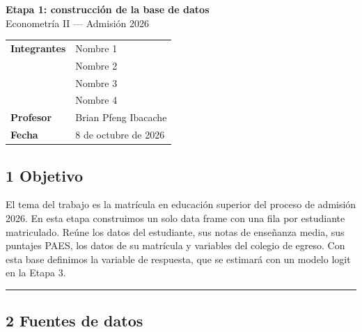 \documentclass[11pt]{article}
\begin{document}
\sloppy

\begin{center}
  {\LARGE \textbf{Etapa 1: construcción de la base de datos}}\\[4pt]
  {\large Econometría II --- Admisión 2026}
\end{center}
\vspace{0.5em}

\begin{center}
\begin{tabular}{ll}
\toprule
\textbf{Integrantes} & Nombre 1 \\
                     & Nombre 2 \\
                     & Nombre 3 \\
                     & Nombre 4 \\
\midrule
\textbf{Profesor}    & Brian Pfeng Ibacache \\
\textbf{Fecha}       & 8 de octubre de 2026 \\
\bottomrule
\end{tabular}
\end{center}

\bigskip

\subsection*{1 \; Objetivo}

El tema del trabajo es la matrícula en educación superior del proceso de
admisión 2026. En esta etapa construimos un solo data frame con una fila
por estudiante matriculado. Reúne los datos del estudiante, sus notas de
enseñanza media, sus puntajes PAES, los datos de su matrícula y variables
del colegio de egreso. Con esta base definimos la variable de respuesta,
que se estimará con un modelo logit en la Etapa 3.

\medskip\hrule\medskip

\subsection*{2 \; Fuentes de datos}
\end{document}
